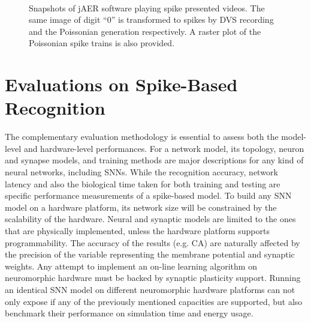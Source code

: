 \documentclass[journal]{journal}
\begin{document}
	\begin{figure}[hbt]
		\centering
		\\
		
		\caption{
			Snapshots of jAER software playing spike presented videos.
			The same image of digit ``0'' is transformed to spikes by DVS recording and the Poissonian generation respectively.
			A raster plot of the Poissonian spike trains is also provided.}
		\label{fig:zero}
	\end{figure}
	
\section{Evaluations on Spike-Based Recognition}
	The complementary evaluation methodology is essential to assess both the model-level and hardware-level performances.
	For a network model, its topology, neuron and synapse models, and training methods are major descriptions for any kind of neural networks, including SNNs.
	While the recognition accuracy, network latency and also the biological time taken for both training and testing are specific performance measurements of a spike-based model.
	To build any SNN model on a hardware platform, its network size will be constrained by the scalability of the hardware. Neural and synaptic models are limited to the ones that are physically implemented, unless the hardware platform supports programmability.
	The accuracy of the results (e.g. CA) are naturally affected by the precision of the variable representing the membrane potential and synaptic weights.
	Any attempt to implement an on-line learning algorithm on neuromorphic hardware must be backed by synaptic plasticity support.
	Running an identical SNN model on different neuromorphic hardware platforms can not only expose if any of the previously mentioned capacities are supported, but also benchmark their performance on simulation time and energy usage.
	
\end{document}
